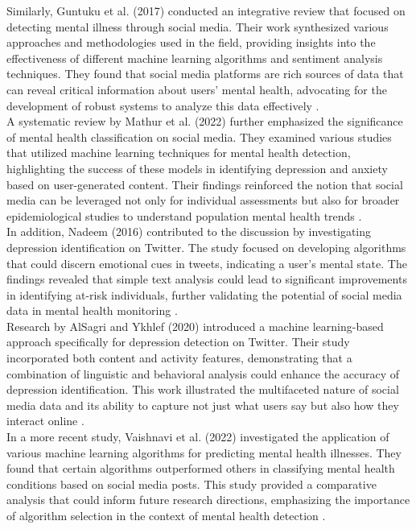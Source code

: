 \noindent
Similarly, Guntuku et al. (2017) conducted an integrative review that focused on detecting mental illness through social media. Their work synthesized various approaches and methodologies used in the field, providing insights into the effectiveness of different machine learning algorithms and sentiment analysis techniques. They found that social media platforms are rich sources of data that can reveal critical information about users' mental health, advocating for the development of robust systems to analyze this data effectively \cite{Guntuku2017DetectingDA}. \\

\noindent
A systematic review by Mathur et al. (2022) further emphasized the significance of mental health classification on social media. They examined various studies that utilized machine learning techniques for mental health detection, highlighting the success of these models in identifying depression and anxiety based on user-generated content. Their findings reinforced the notion that social media can be leveraged not only for individual assessments but also for broader epidemiological studies to understand population mental health trends \cite{Mathur2022MentalHC}. \\

\noindent
In addition, Nadeem (2016) contributed to the discussion by investigating depression identification on Twitter. The study focused on developing algorithms that could discern emotional cues in tweets, indicating a user's mental state. The findings revealed that simple text analysis could lead to significant improvements in identifying at-risk individuals, further validating the potential of social media data in mental health monitoring \cite{nadeem2016identifying}. \\

\noindent
Research by AlSagri and Ykhlef (2020) introduced a machine learning-based approach specifically for depression detection on Twitter. Their study incorporated both content and activity features, demonstrating that a combination of linguistic and behavioral analysis could enhance the accuracy of depression identification. This work illustrated the multifaceted nature of social media data and its ability to capture not just what users say but also how they interact online \cite{alsagri2020machine}. \\

\noindent
In a more recent study, Vaishnavi et al. (2022) investigated the application of various machine learning algorithms for predicting mental health illnesses. They found that certain algorithms outperformed others in classifying mental health conditions based on social media posts. This study provided a comparative analysis that could inform future research directions, emphasizing the importance of algorithm selection in the context of mental health detection \cite{Vaishnavi_2022}. \\

